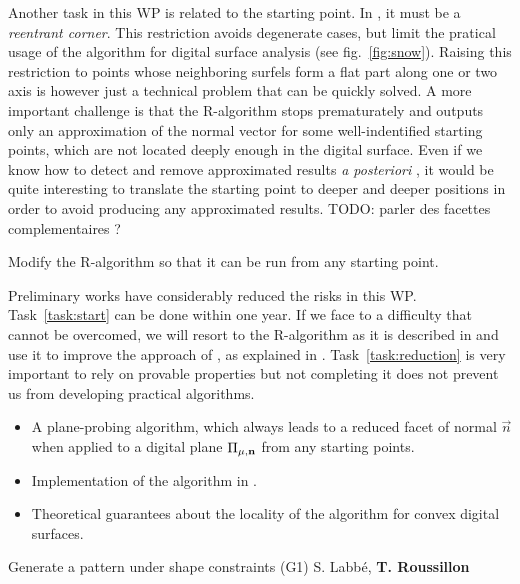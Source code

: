 Another task in this WP is related to the starting point. In \cite{LPRJMIV2017},
it must be a \emph{reentrant corner}. This restriction avoids degenerate cases, but
limit the pratical usage of the algorithm for digital surface analysis
(see fig.~\ref{fig:snow}). Raising this restriction to points whose neighboring
surfels form a flat part along one or two axis is however just a technical
problem that can be quickly solved. A more important challenge is that the R-algorithm
stops prematurately and outputs only an approximation of the normal vector for some
well-indentified starting points, which are not located deeply enough in the digital
surface. Even if we know how to detect and remove approximated results
\emph{a posteriori} \cite{LPRJMIV2017}, it would be quite interesting to translate
the starting point to deeper and deeper positions in order to avoid producing any
approximated results.
TODO: parler des facettes complementaires ?

\begin{Task}
  \label{task:start}
  Modify the R-algorithm so that it can be run from any starting point. 
\end{Task}


\Risks
Preliminary works have considerably reduced the risks in this WP. Task~\ref{task:start}
can be done within one year. If we face to a difficulty that cannot be overcomed,
we will resort to the R-algorithm as it is described in \cite{LPRJMIV2017} and use it
to improve the approach of \citeauthor*{Charrier2011} \cite{Charrier2011}, as explained
in . Task~\ref{task:reduction} is very important to rely on provable
properties but not completing it does not prevent us from developing practical algorithms.

\Success
\begin{itemize}
    \item A plane-probing algorithm, which always leads to a
      reduced facet of normal $\vec{n}$ when applied to a digital
      plane $\Pi_{\mu,\mathbf{n}}$ from any starting points.
    \item Implementation of the algorithm in \DGtal.   
    \item Theoretical guarantees about the locality of the algorithm
      for convex digital surfaces.  
\end{itemize}


   {Generate a pattern under shape constraints (G1)}
   {S. Labb\'{e}, \textbf{T. Roussillon}}
\medskip


